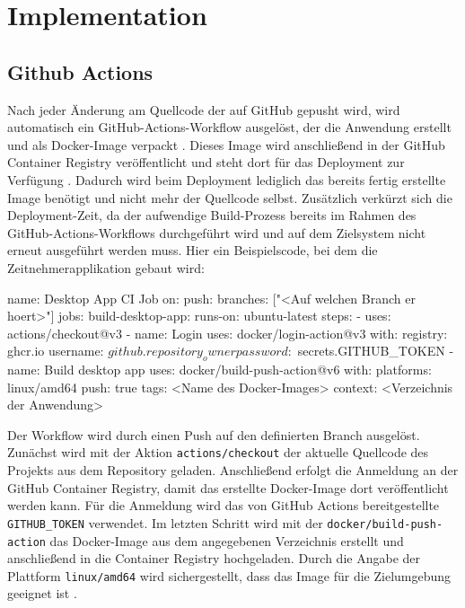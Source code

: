 ﻿%

\section{Implementation}

\subsection{Github Actions}

Nach jeder Änderung am Quellcode der auf GitHub gepusht wird, wird automatisch ein GitHub-Actions-Workflow ausgelöst, der die Anwendung erstellt und als Docker-Image verpackt \cite{github_actions}. Dieses Image wird anschließend in der GitHub Container Registry veröffentlicht und steht dort für das Deployment zur Verfügung \cite{github_container_registry}. Dadurch wird beim Deployment lediglich das bereits fertig erstellte Image benötigt und nicht mehr der Quellcode selbst. Zusätzlich verkürzt sich die Deployment-Zeit, da der aufwendige Build-Prozess bereits im Rahmen des GitHub-Actions-Workflows durchgeführt wird und auf dem Zielsystem nicht erneut ausgeführt werden muss.
Hier ein Beispielscode, bei dem die Zeitnehmerapplikation gebaut wird:

\begin{CodeBox}
name: Desktop App CI Job
on:
  push:
    branches: ["<Auf welchen Branch er hoert>"]
jobs:
  build-desktop-app:
    runs-on: ubuntu-latest
    steps:
      - uses: actions/checkout@v3
      - name: Login
        uses: docker/login-action@v3
        with:
          registry: ghcr.io
          username: ${{ github.repository_owner }}
          password: ${{ secrets.GITHUB_TOKEN }}
      - name: Build desktop app
        uses: docker/build-push-action@v6
        with:
          platforms: linux/amd64
          push: true
          tags: <Name des Docker-Images>
          context: <Verzeichnis der Anwendung>
\end{CodeBox}

Der Workflow wird durch einen Push auf den definierten Branch ausgelöst. Zunächst wird mit der Aktion \texttt{actions/checkout} der aktuelle Quellcode des Projekts aus dem Repository geladen. Anschließend erfolgt die Anmeldung an der GitHub Container Registry, damit das erstellte Docker-Image dort veröffentlicht werden kann. Für die Anmeldung wird das von GitHub Actions bereitgestellte \texttt{GITHUB\_TOKEN} verwendet. Im letzten Schritt wird mit der \texttt{docker/build-push-action} das Docker-Image aus dem angegebenen Verzeichnis erstellt und anschließend in die Container Registry hochgeladen. Durch die Angabe der Plattform \texttt{linux/amd64} wird sichergestellt, dass das Image für die Zielumgebung geeignet ist \cite{docker_build_push_action}.

